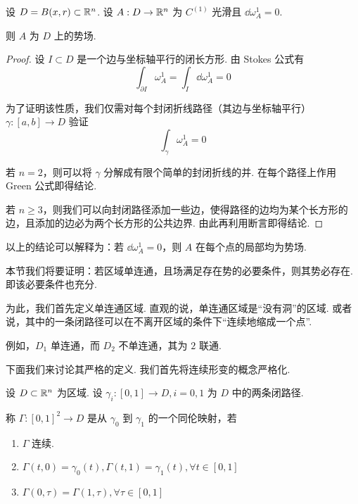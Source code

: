 \begin{property}
    设 $D=B(x,r)\subset\mathbb{R}^n$. 设 $A:D\to\mathbb{R}^n$ 为 $C^{(1)}$ 光滑且 $\dd\omega_A^1=0$.

    则 $A$ 为 $D$ 上的势场.
\end{property}
\begin{proof}
    设 $I\subset D$ 是一个边与坐标轴平行的闭长方形. 由 Stokes 公式有
$$
\int_{\partial I}\omega_A^1=\int_I\dd\omega_A^1=0
$$

    为了证明该性质，我们仅需对每个封闭折线路径（其边与坐标轴平行）$\gamma:[a,b]\to D$ 验证
$$
\int_\gamma\omega_A^1=0
$$

    若 $n=2$，则可以将 $\gamma$ 分解成有限个简单的封闭折线的并. 在每个路径上作用 Green 公式即得结论.


    若 $n\ge 3$，则我们可以向封闭路径添加一些边，使得路径的边均为某个长方形的边，且添加的边必为两个长方形的公共边界. 由此再利用断言即得结论.
\end{proof}

\begin{hint}
    以上的结论可以解释为：若 $\dd\omega_A^1=0$，则 $A$ 在每个点的局部均为势场.
\end{hint}


本节我们将要证明：若区域单连通，且场满足存在势的必要条件，则其势必存在. 即该必要条件也充分.

为此，我们首先定义单连通区域. 直观的说，单连通区域是“没有洞”的区域. 或者说，其中的一条闭路径可以在不离开区域的条件下“连续地缩成一个点”.


例如，$D_1$ 单连通，而 $D_2$ 不单连通，其为 $2$ 联通.

下面我们来讨论其严格的定义. 我们首先将连续形变的概念严格化.

\begin{definition}
    设 $D\subset\mathbb{R}^n$ 为区域. 设 $\gamma_i:[0,1]\to D,i=0,1$ 为 $D$ 中的两条闭路径.

    称 $\Gamma:[0,1]^2\to D$ 是从 $\gamma_0$ 到 $\gamma_1$ 的一个同伦映射，若

    \begin{enumerate}
        \item $\Gamma$ 连续.

        \item $\Gamma(t,0)=\gamma_0(t),\Gamma(t,1)=\gamma_1(t),\forall t\in[0,1]$
        
        \item $\Gamma(0,\tau)=\Gamma(1,\tau),\forall\tau\in[0,1]$
    \end{enumerate}
\end{definition}

